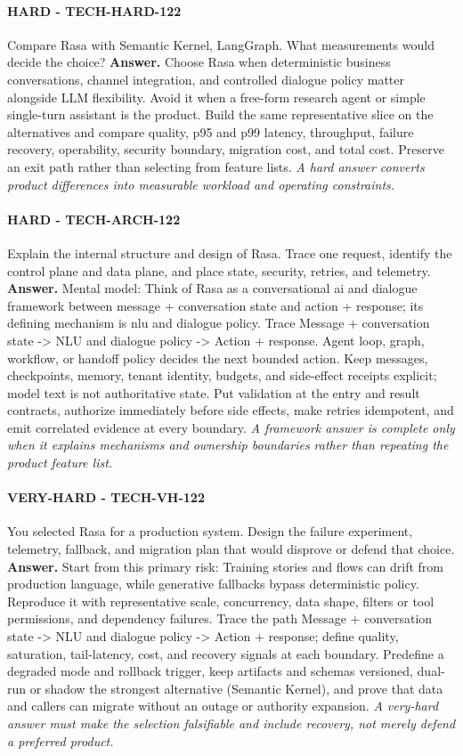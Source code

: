 \paragraph{HARD - TECH-HARD-122} Compare Rasa with Semantic Kernel, LangGraph. What measurements would decide the choice?
\textbf{Answer.} Choose Rasa when deterministic business conversations, channel integration, and controlled dialogue policy matter alongside LLM flexibility. Avoid it when a free-form research agent or simple single-turn assistant is the product. Build the same representative slice on the alternatives and compare quality, p95 and p99 latency, throughput, failure recovery, operability, security boundary, migration cost, and total cost. Preserve an exit path rather than selecting from feature lists.
\textit{A hard answer converts product differences into measurable workload and operating constraints.}
\paragraph{HARD - TECH-ARCH-122} Explain the internal structure and design of Rasa. Trace one request, identify the control plane and data plane, and place state, security, retries, and telemetry.
\textbf{Answer.} Mental model: Think of Rasa as a conversational ai and dialogue framework between message + conversation state and action + response; its defining mechanism is nlu and dialogue policy. Trace Message + conversation state -> NLU and dialogue policy -> Action + response. Agent loop, graph, workflow, or handoff policy decides the next bounded action. Keep messages, checkpoints, memory, tenant identity, budgets, and side-effect receipts explicit; model text is not authoritative state. Put validation at the entry and result contracts, authorize immediately before side effects, make retries idempotent, and emit correlated evidence at every boundary.
\textit{A framework answer is complete only when it explains mechanisms and ownership boundaries rather than repeating the product feature list.}
\paragraph{VERY-HARD - TECH-VH-122} You selected Rasa for a production system. Design the failure experiment, telemetry, fallback, and migration plan that would disprove or defend that choice.
\textbf{Answer.} Start from this primary risk: Training stories and flows can drift from production language, while generative fallbacks bypass deterministic policy. Reproduce it with representative scale, concurrency, data shape, filters or tool permissions, and dependency failures. Trace the path Message + conversation state -> NLU and dialogue policy -> Action + response; define quality, saturation, tail-latency, cost, and recovery signals at each boundary. Predefine a degraded mode and rollback trigger, keep artifacts and schemas versioned, dual-run or shadow the strongest alternative (Semantic Kernel), and prove that data and callers can migrate without an outage or authority expansion.
\textit{A very-hard answer must make the selection falsifiable and include recovery, not merely defend a preferred product.}

